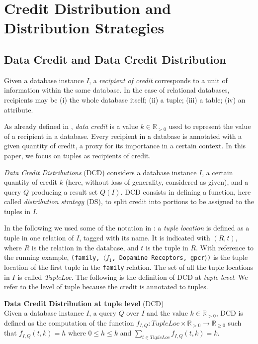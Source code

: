 \section{Credit Distribution and Distribution Strategies}
\label{section:distribution_strategies}

\subsection{Data Credit and Data Credit Distribution}
Given a database instance $I$, a \emph{recipient of credit} corresponds to a unit of information within the same database. In the case of relational databases, recipients may be (i) the whole database itself; (ii) a tuple; (iii) a table; (iv) an attribute.

As already defined in \citep{dosso2020data}, \emph{data credit} is a value $k \in \mathbb{R}_{>0}$ used to represent the value of a recipient in a database. 
Every recipient in a database is annotated with a given quantity of credit, a proxy for its importance in a certain context. In this paper, we focus on tuples as recipients of credit. 

\emph{Data Credit Distributions} (DCD) considers a database instance $I$, a certain quantity of credit $k$ (here, without loss of generality, considered as given), and a query $Q$ producing a result set $Q(I)$.  
DCD consists in defining a function, here called \emph{distribution strategy} (DS), to split credit into portions to be assigned to the tuples in $I$.

In the following we used some of the notation in \citep{CheneyProvSurvey}: a \emph{tuple location} is defined as a tuple in one relation of $I$, tagged with its name. It is indicated with $(R, t)$, where $R$ is the relation in the database, and $t$ is the tuple in $R$. With reference to the running example, \texttt{(family, $\langle f_1$, Dopamine Receptors, gpcr$\rangle$)} is the tuple location of the first tuple in the \texttt{family} relation.  The set of all the tuple locations in $I$ is called \emph{TupleLoc}.
The following is the definition of DCD at \emph{tuple level}. We refer to the level of tuple because the credit is annotated to tuples.

\begin{definition}
    \textbf{Data Credit Distribution at tuple level} (DCD)~\citep{dosso2020data}
    \label{def:CDT}\\
    Given a database instance $I$, a query $Q$ over $I$ and the value $k \in \mathbb{R}_{>0}$, DCD is defined as the computation of the function $f_{I, Q} : TupleLoc \times \mathbb{R}_{> 0} \rightarrow \mathbb{R}_{\geq0}$ such that $f_{I,Q}(t, k)=h$ where $0 \leq h \leq k$ and $\sum_{t \in TupleLoc}f_{I, Q}(t, k) = k$.
\end{definition}

